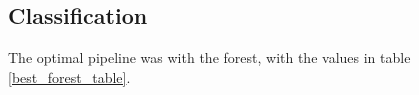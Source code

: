 \documentclass[12pt, letterpaper]{article}
\begin{document}

\subsection{Classification}

The optimal pipeline was with the forest, with the values in table \ref{best_forest_table}.

\begin{table}[H]
\centering
\caption{Best pipeline values overall}
\label{best_forest_table}
\end{table}
\end{document}
